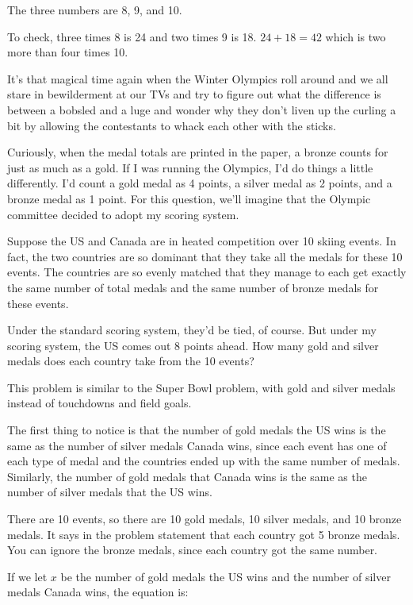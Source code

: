 \documentclass[fleqn,addpoints]{exam}
\begin{document}
\begin{questions}
\begin{solution}[4 cm]
The three numbers are 8, 9, and 10.  

To check, three times 8 is 24 and two times 9 is 18.  $24 + 18 = 42$ which is two more than four times 10.
\end{solution}

\question[5]
\label{word:last}
It's that magical time again when the Winter Olympics roll around and we all stare in bewilderment at our TVs and try
to figure out what the difference is between a bobsled and a luge and wonder why they don't liven up the curling a bit by allowing
the contestants to whack each other with the sticks.

Curiously, when the medal totals are printed in the paper, a bronze counts for just as much as a gold.  If I was running
the Olympics, I'd do things a little differently.  I'd count a gold medal as 4 points, a silver medal as 2 points, and a
bronze medal as 1 point.  For this question, we'll imagine that the Olympic committee decided to adopt my scoring
system.

Suppose the US and Canada are in heated competition over 10 skiing events.  In fact, the two countries are so dominant
that they take all the medals for these 10 events.  The countries are so evenly matched that they manage to
each get exactly the same number of total medals and the same number of bronze medals for these events.

Under the standard scoring system, they'd be tied, of course.  But under my scoring system, the US comes out 8 points
ahead.  How many gold and silver medals does each country take from the 10 events?

\begin{solution}[5 cm]
This problem is similar to the Super Bowl problem, with gold and silver medals instead of touchdowns and field goals.

The first thing to notice is that the number of gold medals the US wins is the same as the number of silver medals
Canada wins, since each event has one of each type of medal and the countries ended up with the same number of medals.
Similarly, the number of gold medals that Canada wins is the same as the number of silver medals that the US wins.

There are 10 events, so there are 10 gold medals, 10 silver medals, and 10 bronze medals.  It says in the problem
statement that each country got 5 bronze medals.  You can ignore the bronze medals, since each country got the same
number. 

If we let $x$ be the number of gold medals the US wins and the number
of silver medals Canada wins, the equation is:


\end{solution}
\end{questions}
\end{document}
